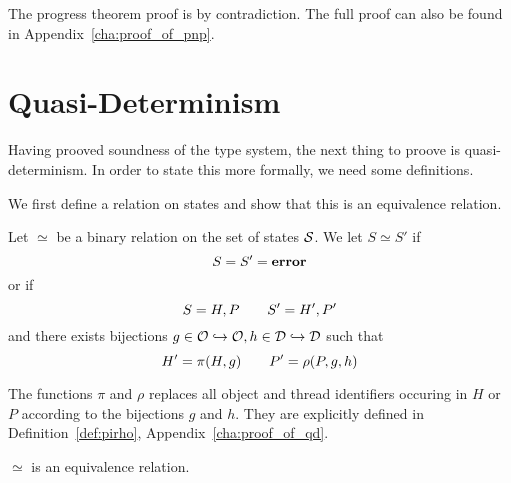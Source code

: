 The progress theorem proof is by contradiction. The full proof can also be found in
Appendix~\ref{cha:proof_of_pnp}.

\section{Quasi-Determinism}%
\label{sec:quasi_determinism}

Having prooved soundness of the type system, the next thing to proove is
quasi-determinism. In order to state this more formally, we need some
definitions.

We first define a relation on states and show that this is an equivalence
relation.
\begin{definition} \label{def:eqrel}
  Let $\simeq$ be a binary relation on the set of states $\mathcal{S}$.
  We let $S \simeq S'$ if
  \begin{equation*}
    S = S' = \mbox{{\bf error}}
  \end{equation*}
  or if
  \begin{equation}
    S = H, P \quad\quad S' = H', P'
  \end{equation}
  and there exists bijections $g \in \mathcal{O} \hookrightarrow \mathcal{O}, h \in \mathcal{D}
  \hookrightarrow \mathcal{D}$ such that
  \begin{equation}
    H' = \pi(H, g) \quad\quad P' = \rho(P, g, h)
  \end{equation}
  
  The functions $\pi$ and $\rho$ replaces all object and thread identifiers
  occuring in $H$ or $P$ according to the bijections $g$ and $h$. They are
  explicitly defined in Definition~\ref{def:pirho},
  Appendix~\ref{cha:proof_of_qd}.
\end{definition}



\begin{proposition} \label{prop:eqrel}
  $\simeq$ is an equivalence relation.
\end{proposition}

